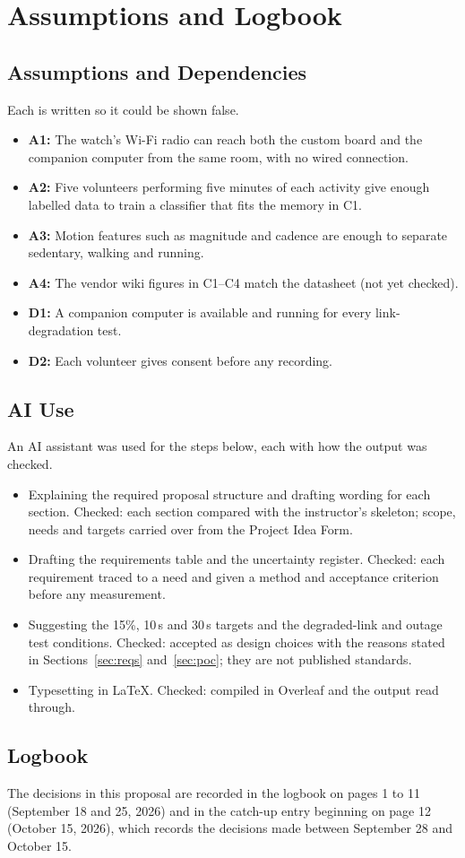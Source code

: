 \section{Assumptions and Logbook}

\subsection{Assumptions and Dependencies}

Each is written so it could be shown false.
\begin{itemize}
\item \textbf{A1:} The watch's Wi-Fi radio can reach both the
custom board and the companion computer from the same room, with
no wired connection.
\item \textbf{A2:} Five volunteers performing five minutes of each
activity give enough labelled data to train a classifier that fits
the memory in C1.
\item \textbf{A3:} Motion features such as magnitude and cadence
are enough to separate sedentary, walking and running.
\item \textbf{A4:} The vendor wiki figures in C1--C4 match the
datasheet (not yet checked).
\item \textbf{D1:} A companion computer is available and running
for every link-degradation test.
\item \textbf{D2:} Each volunteer gives consent before any
recording.
\end{itemize}

\subsection{AI Use}

An AI assistant was used for the steps below, each with how the
output was checked.
\begin{itemize}
\item Explaining the required proposal structure and drafting
wording for each section. Checked: each section compared with the
instructor's skeleton; scope, needs and targets carried over from
the Project Idea Form.
\item Drafting the requirements table and the uncertainty
register. Checked: each requirement traced to a need and given a
method and acceptance criterion before any measurement.
\item Suggesting the 15\%, 10\,s and 30\,s targets and the
degraded-link and outage test conditions. Checked: accepted as
design choices with the reasons stated in Sections~\ref{sec:reqs}
and~\ref{sec:poc}; they are not published standards.
\item Typesetting in LaTeX. Checked: compiled in Overleaf and the
output read through.
\end{itemize}

\subsection{Logbook}

The decisions in this proposal are recorded in the logbook on
pages 1 to 11 (September 18 and 25, 2026) and in the catch-up
entry beginning on page 12 (October 15, 2026), which records the
decisions made between September 28 and October 15.
